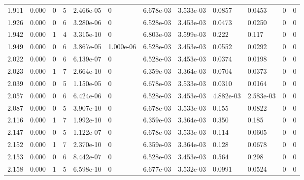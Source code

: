 \documentclass[preview]{standalone}
\begin{document}
{{{\begin{tabular}{L{1.2cm}C{1.2cm} C{0.3cm}C{0.5cm} C{1.4cm}C{1.4cm} C{1.4cm}C{1.4cm} C{1.6cm}C{1.6cm} C{1.6cm}C{1.6cm}}
  1.911  &  0.000  & 0     &  5 &  2.466e-05  & 0  &  6.678e-03&   3.533e-03& 0.0857 & 0.0453   &  0 & 0  \\ 
  1.926  &  0.000  & 0     &  6 &  3.280e-06  & 0  &  6.528e-03&   3.453e-03& 0.0473 & 0.0250   &  0 & 0  \\ 
  1.942  &  0.000  & 1     &  4 &  3.315e-10  & 0  &  6.803e-03&   3.599e-03& 0.222 & 0.117   &  0 & 0  \\ 
  1.949  &  0.000  & 0     &  6 &  3.867e-05  & 1.000e-06  &  6.528e-03&   3.453e-03& 0.0552 & 0.0292   &  0 & 0  \\ 
  2.022  &  0.000  & 0     &  6 &  6.139e-07  & 0  &  6.528e-03&   3.453e-03& 0.0374 & 0.0198   &  0 & 0  \\ 
  2.023  &  0.000  & 1     &  7 &  2.664e-10  & 0  &  6.359e-03&   3.364e-03& 0.0704 & 0.0373   &  0 & 0  \\ 
  2.039  &  0.000  & 0     &  5 &  1.150e-05  & 0  &  6.678e-03&   3.533e-03& 0.0310 & 0.0164   &  0 & 0  \\ 
  2.057  &  0.000  & 0     &  6 &  6.424e-06  & 0  &  6.528e-03&   3.453e-03& 4.882e-03 & 2.583e-03   &  0 & 0  \\ 
  2.087  &  0.000  & 0     &  5 &  3.907e-10  & 0  &  6.678e-03&   3.533e-03& 0.155 & 0.0822   &  0 & 0  \\ 
  2.116  &  0.000  & 1     &  7 &  1.992e-10  & 0  &  6.359e-03&   3.364e-03& 0.350 & 0.185   &  0 & 0  \\ 
  2.147  &  0.000  & 0     &  5 &  1.122e-07  & 0  &  6.678e-03&   3.533e-03& 0.114 & 0.0605   &  0 & 0  \\ 
  2.152  &  0.000  & 1     &  7 &  2.370e-10  & 0  &  6.359e-03&   3.364e-03& 0.128 & 0.0678   &  0 & 0  \\ 
  2.153  &  0.000  & 0     &  6 &  8.442e-07  & 0  &  6.528e-03&   3.453e-03& 0.564 & 0.298   &  0 & 0  \\ 
  2.158  &  0.000  & 1     &  5 &  6.598e-10  & 0  &  6.677e-03&   3.532e-03& 0.0991 & 0.0524   &  0 & 0  \\ 
\hline 
\end{tabular} 

}}}
\end{document}
